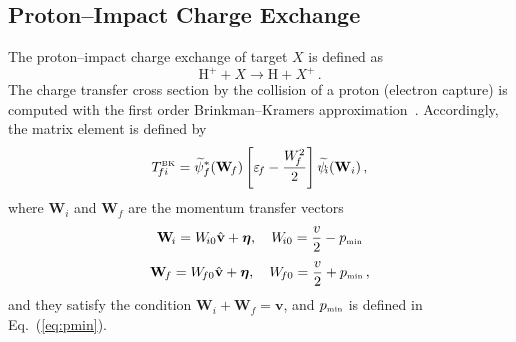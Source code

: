 \documentclass[10pt]{article}
\begin{document}
\subsection{Proton--Impact Charge Exchange}

The proton--impact charge exchange of target $X$ is defined as
\begin{equation}
 \mbox{H}^+ + X \rightarrow \mbox{H} + X^+\,.
\end{equation}
The charge transfer cross section by the collision of a proton 
(electron capture) is computed with the first order Brinkman--Kramers 
approximation~\cite{Brinkman1930}. Accordingly, the matrix element is 
defined by 
\begin{equation}
 T_{\!fi}^{\mbox{\tiny BK}} = \widetilde{\psi}_f^*(\mathbf{W}_{\!f})
 \left[\varepsilon_{\!f}-\frac{W_{\!f}^2}{2} \right]
 \widetilde{\psi}_{\!i}(\mathbf{W}_i)\,,
\end{equation}
where $\mathbf{W}_{\!i}$ and $\mathbf{W}_{\!f}$ are the momentum 
transfer vectors 
\begin{equation}
 \mathbf{W}_{\!i} = W_{\!i0} \hat{\mathbf{v}} + \boldsymbol{\eta}, \quad 
 W_{\!i0} = \frac{v}{2} - p_{\mbox{\tiny min}}
 \label{eq:momtransfi0}
\end{equation}
\begin{equation}
 \mathbf{W}_{\!f} = W_{\!f0} \hat{\mathbf{v}} + \boldsymbol{\eta}, \quad 
 W_{\!f0} = \frac{v}{2} + p_{\mbox{\tiny min}}\,,
 \label{eq:momtransff0}
\end{equation}
and they satisfy the condition $\mathbf{W}_{\!i}+\mathbf{W}_{\!f}=\mathbf{v}$,
and $p_{\mbox{\tiny min}}$ is defined in Eq.~(\ref{eq:pmin}).
\end{document}
